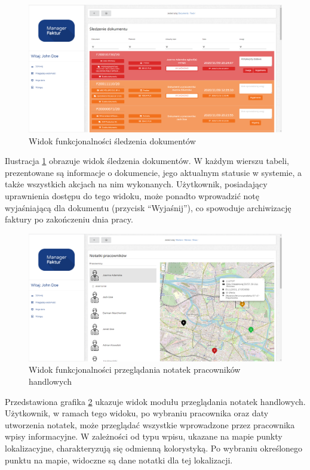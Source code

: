 \begin{figure}[ht]
 \centering
  \includegraphics[width=0.95\linewidth]{rys04/zrzut4}
 \caption{Widok funkcjonalności śledzenia dokumentów}
 \label{fig:gui-webowa-zrzut4}
\end{figure}

Ilustracja \ref{fig:gui-webowa-zrzut4} obrazuje widok śledzenia dokumentów. W każdym wierszu tabeli, prezentowane są informacje o dokumencie, jego aktualnym statusie w systemie, a także wszystkich akcjach na nim wykonanych. Użytkownik, posiadający uprawnienia dostępu do tego widoku, może ponadto wprowadzić notę wyjaśniającą dla dokumentu (przycisk "`Wyjaśnij"'), co spowoduje archiwizację faktury po zakończeniu dnia pracy.

\begin{figure}[ht]
 \centering
  \includegraphics[width=0.95\linewidth]{rys04/zrzut5}
 \caption{Widok funkcjonalności przeglądania notatek pracowników handlowych}
 \label{fig:gui-webowa-zrzut5}
\end{figure}

Przedstawiona grafika \ref{fig:gui-webowa-zrzut5} ukazuje widok modułu przeglądania notatek handlowych. Użytkownik, w ramach tego widoku, po wybraniu pracownika oraz daty utworzenia notatek, może przeglądać wszystkie wprowadzone przez pracownika wpisy informacyjne. W zależności od typu wpisu, ukazane na mapie punkty lokalizacyjne, charakteryzują się odmienną kolorystyką. Po wybraniu określonego punktu na mapie, widoczne są dane notatki dla tej lokalizacji.


